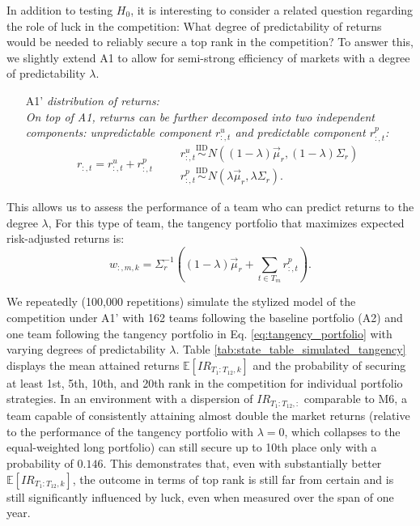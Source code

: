 \documentclass[3p,times,twocolumn]{elsarticle}
\begin{document}
In addition to testing $H_{0}$, it is interesting to consider a related question regarding the role of luck in the competition: What degree of predictability of returns would be needed to reliably secure a top rank in the competition?
To answer this, we slightly extend A1 to allow for semi-strong efficiency of markets with a degree of predictability $\lambda$.
\begin{itemize}
    \item[A1']  \emph{distribution of returns:}\\
        \emph{
            On top of A1, returns can be further decomposed into two independent components: unpredictable component $r_{:,t}^{u}$ and predictable component $r_{:,t}^{p}$:
        }
        \begin{equation}
            r_{:,t}=r_{:,t}^{u}+r_{:,t}^{p} \qquad
            \begin{array}{l}
                r_{:,t}^{u} \overset{\mathrm{IID}}{\sim} N((1-\lambda)\vec{\mu}_{r}, (1-\lambda)\Sigma_{r}) \\
                r_{:,t}^{p} \overset{\mathrm{IID}}{\sim} N(\lambda\vec{\mu}_{r}, \lambda\Sigma_{r}).
            \end{array}
        \end{equation}
\end{itemize}
This allows us to assess the performance of a team who can predict returns to the degree $\lambda$, 
For this type of team, the tangency portfolio that maximizes expected risk-adjusted returns \cite[see e.g.,][]{kourtisSharpeRatioEstimated2016} is:
\begin{equation}\label{eq:tangency_portfolio}
    w_{:,m,k}=\Sigma_{r}^{-1}((1-\lambda) \vec{\mu}_{r} + \sum_{t\in T_{m}}r_{:,t}^{p}).
\end{equation}


We repeatedly (100,000 repetitions) simulate the stylized model of the competition under A1' with 162 teams following the baseline portfolio (A2) and one team following the tangency portfolio in Eq. \ref{eq:tangency_portfolio} with varying degrees of predictability $\lambda$.
Table \ref{tab:state_table_simulated_tangency} displays the mean attained returns $\mathbb{E}[IR_{T_{1}:T_{12},k}]$ and the probability of securing at least 1st, 5th, 10th, and 20th rank in the competition for individual portfolio strategies. 
In an environment with a dispersion of $IR_{T_{1}:T_{12},:}$ comparable to M6, a team capable of consistently attaining almost double the market returns (relative to the performance of the tangency portfolio with $\lambda = 0$, which collapses to the equal-weighted long portfolio) can still secure up to 10th place only with a probability of $0.146$. 
This demonstrates that, even with substantially better $\mathbb{E}[IR_{T_{1}:T_{12},k}]$, the outcome in terms of top rank is still far from certain and is still significantly influenced by luck, even when measured over the span of one year.
\end{document}
